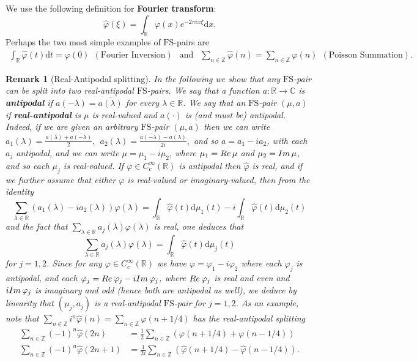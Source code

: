 \documentclass[a4paper,reqno,12pt]{amsart}
\newtheorem{remark}{Remark}
\newcommand{\z}{\mathbb{Z}}
\renewcommand{\r}{\mathbb{R}}
\newcommand{\cp}{\mathbb{C}} %
\newcommand{\ft}{\widehat}
\newcommand{\la}{\lambda}
\newcommand{\p}{\varphi}
\renewcommand{\d}{\mathrm{d}}
\newcommand{\1}{{\bf 1}}
\newcommand{\fs}{\mathrm{FS}}
\renewcommand{\emph}[1]{{\bf #1}}
\newcommand{\ov}[1]{\overline{#1}}
\renewcommand{\1}{{\bo 1}}
\renewcommand{\Re}{{\rm Re}\,}
\renewcommand{\Im}{{\rm Im}\,}
\renewcommand{\a}{a(\cdot)}
\begin{document}
\noindent  We use the following definition for \emph{Fourier transform}:
$$
\ft \p(\xi) = \int_\r \p(x)e^{-2\pi i x \xi}\d x.
$$
Perhaps the two most simple examples of $\fs$-pairs are
\begin{align*}
 \int_\r \ft \p(t)\d t = \p(0) \ \ (\text{Fourier Inversion}) \ \ \text{ and }  \ \ \sum_{n\in \z} \ft \p(n) = \sum_{n\in \z} \p(n)  \ \ (\text{Poisson Summation}).
\end{align*}

\begin{remark}[Real-Antipodal splitting]
In the following we show that any $\fs$-pair can be split into two real-antipodal $\fs$-pairs. We say that a function $a:\r \to \cp$ is \emph{antipodal} if $a(-\la)=\ov{a(\la)}$ for every $\la\in\r$. We say that an $\fs$-pair $(\mu,a)$ if \emph{real-antipodal} is $\mu$ is real-valued and $\a$ is (and must be) antipodal.  Indeed, if we are given an arbitrary $\fs$-pair $(\mu,a)$ then we can write 
$
a_1(\la) = \frac{a(\la)+\ov{a(-\la)}}{2}, \ \ a_2(\la)=\frac{\ov{a(-\la)}-a(\la)}{2i},
$
and so $a=a_1-ia_2$, with each $a_j$ antipodal, and we can write 
$\mu= \mu_1 - i\mu_2$, where $\mu_1=\Re \mu$ and $\mu_2=\Im \mu$, and so each $\mu_j$ is real-valued. If $\p\in C^\infty_c(\r)$ is antipodal then $\ft \p$ is real, and if we further assume that either $\p$ is real-valued or imaginary-valued, then from the identity
$$
\sum_{\la\in \r} (a_1(\la)-ia_2(\la))\p(\la) = \int_\r \ft \p(t)\d \mu_1(t) -i \int_\r \ft \p(t)\d \mu_2(t) 
$$
and the fact that $\sum_{\la\in \r} a_j(\la)\p(\la) $ is real, one deduces that
$$
\sum_{\la\in \r} a_j(\la)\p(\la) = \int_\r \ft \p(t)\d \mu_j(t)
$$
for $j=1,2$. Since for any $\p\in C^\infty_c(\r)$ we have $\p=\p_1-i\p_2$ where each $\p_j$ is antipodal, and each $\p_j=\Re \p_{j}- i \Im \p_{j}$, where $\Re \p_{j}$ is real and even and $i \Im \p_{j}$ is imaginary and odd (hence both are antipodal as well), we deduce by linearity that $(\mu_j,a_j)$ is a real-antipodal $\fs$-pair for $j=1,2$. As an example, note that
$
\sum_{n \in \z} i^n \ft \p(n) = \sum_{n\in \z} \p(n+1/4)
$
has the real-antipodal splitting 
\begin{align*}
\sum_{n \in \z} (-1)^n \ft \p(2n)  &= \frac12 \sum_{n\in \z} \left(\p(n+1/4) +  \p(n-1/4)\right)\\ 
\sum_{n \in \z} (-1)^n \ft \p(2n+1) & =  \frac{1}{2i}\sum_{n\in \z} \left(\ft \p(n+1/4) - \ft \p(n-1/4)\right).
\end{align*}
\end{remark}
\end{document}
